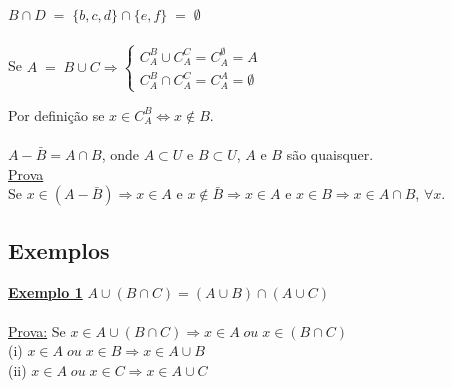 \begin{enumerate}
$ B \cap D \; = \; \{ b, c, d \} \cap \{ e, f \}  \; = \; \emptyset $ \\ \\

\text{\maltese} Se $ A \; = \; B \cup C \Rightarrow 
\begin{cases}
C_A^B \cup C_A^C = C_A^{\emptyset} = A \\
C_A^B \cap C_A^C = C_A^A = \emptyset
\end{cases} $\\

\begin{center}
\end{center}

Por definição se $x \in C_A^B \Leftrightarrow x \notin B$. \\ \\

\text{$(\ast)$ } $ A - \bar{B} = A \cap B$, onde $ A \subset U $ e $ B \subset U $, $A$ e $B$ são quaisquer. \\

\underline{Prova} \\
Se $x \in (A - \bar{B}) \Rightarrow x \in A $ e $x \notin \bar{B} \Rightarrow x \in A$ e $x \in B \Rightarrow x \in A \cap B$, $ \forall x$. 	

		
\end{enumerate}

	

\newpage


\subsection{Exemplos}

\textbf{\underline{Exemplo 1}} $ A \cup (B \cap C) =  (A \cup B) \cap (A \cup C) $  \\ \\
\underline{Prova:} \text{$ \Rightarrow $}  Se $ x \in A \cup (B \cap C) \Rightarrow x \in A \; ou \; x \in (B \cap C) $ \\
(i) $ x \in A \; ou \; x \in B \Rightarrow x \in A \cup B $ \\
(ii) $ x \in A \; ou \; x \in C \Rightarrow x \in A \cup C $ \\

